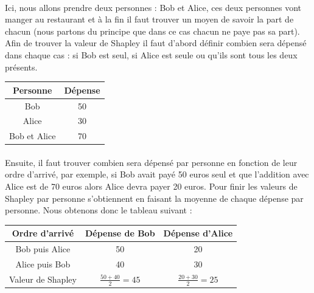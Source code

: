 \documentclass[10pt, french, a4paper]{report}
\begin{document}
\paragraph{}
Ici, nous allons prendre deux personnes : Bob et Alice, ces deux personnes vont manger au restaurant et à la fin il faut trouver un moyen de savoir la part de chacun (nous partons du principe que dans ce cas chacun ne paye pas sa part). Afin de trouver la valeur de Shapley il faut d’abord définir combien sera dépensé dans chaque cas : si Bob est seul, si Alice est seule ou qu’ils sont tous les deux présents. 


\begin{center}
  \begin{tabular}{ |c|c| } 
   \hline
   Personne & Dépense \\ 
   \hline
   Bob & 50 \\
   Alice & 30 \\
   Bob et Alice & 70 \\
   \hline
  \end{tabular}
\end{center}

\paragraph{}
Ensuite, il faut trouver combien sera dépensé par personne en fonction de leur ordre d’arrivé, par exemple, si Bob avait payé 50 euros seul et que l’addition avec Alice est de 70 euros alors Alice devra payer 20 euros. Pour finir les valeurs de Shapley par personne s’obtiennent en faisant la moyenne de chaque dépense par personne. Nous obtenons donc le tableau suivant :


\begin{center}
  \begin{tabular}{ |c|c|c| } 
   \hline
   Ordre d’arrivé & Dépense de Bob & Dépense d’Alice \\ 
   \hline
   Bob puis Alice & 50 & 20 \\
   Alice puis Bob & 40 & 30 \\
   \hline
   Valeur de Shapley & $\frac{50+40}{2} = 45$ & $\frac{20+30}{2} = 25$ \\
   \hline
  \end{tabular}
\end{center}
\end{document}

